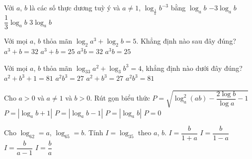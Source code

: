 \begin{ex}%
	 Với $a$, $b$ là các số thực dương tuỳ ý và $a \ne 1$, $\log_{\tfrac{1}{a}} b^{-3}$ bằng
	\choice 
		{$\log_a  b$}
		{$-3\log_a b$} 
		{$\dfrac{1}{3}\log_a  b$}
		{\True $3\log_a b$} 
\end{ex}

\begin{ex}%
	Với mọi $a$, $b$  thỏa mãn $\log_2a^3+\log_2b=5$. Khẳng định nào sau đây đúng?
	\choice 
		{$a^3+b=32$} 
		 {$a^3+b=25$}
		{\True $a^3b=32$} 
		{$a^3b=25$} 
\end{ex}

\begin{ex}%
	Với  mọi $a$, $b$ thỏa mãn $\log_33a^2+\log_3b^3=4$, khẳng định nào dưới đây đúng?
	 \choice
		 {$a^2+b^3+1=81$}
		{\True  $a^2b^3=27$}
		{$a^2+b^3=27$} 
		 {$a^2b^3=81$}
\end{ex}

\begin{ex}%
	Cho $a > 0$ và $a\ne 1$ và $b > 0$.  Rút gọn biểu thức $P=\sqrt{\log_a^2(ab)-\dfrac{2\log b}{\log a}-1}$
	 \choice
		{$P=\left|\log_a  b+1\right|$}
		 {$P=\left|\log_a b-1\right|$}
		 {\True $P=\left|\log_a b\right|$}
		 {$P=0$}
\end{ex}

\begin{ex}%
	Cho $\log_62=a$, $\log_65=b$.  Tính $ I=\log_35$ theo $ a$, $ b$.
	 \choice
		{$  I=\dfrac{b}{1+a}$}
		{\True $ I=\dfrac{b}{1-a}$} 
		{$ I=\dfrac{b}{a-1}$} 
		{$  I=\dfrac{b}{a}$}
\end{ex}

